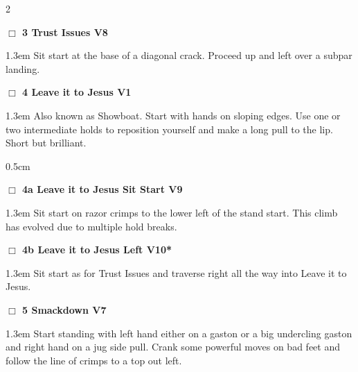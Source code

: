 	\begin{multicols}{2}
\needspace{2em}
\label{rt:Trust Issues}
\colorbox{Goldenrod!20}{
\parbox{0.95\linewidth}{
\hspace{-1ex}\textbf{$\Box$
3 Trust Issues V8  \warn\warn
}}}
\begin{adjustwidth}{1.3em}{}			
Sit start at the base of a diagonal crack. Proceed up and left over a subpar landing.
\end{adjustwidth}
\needspace{2em}
\label{rt:Leave it to Jesus}
\colorbox{green!20}{
\parbox{0.95\linewidth}{
\hspace{-1ex}\textbf{$\Box$
4 Leave it to Jesus V1  
}}}
\begin{adjustwidth}{1.3em}{}			
Also known as Showboat. Start with hands on sloping edges. Use one or two intermediate holds to reposition yourself and make a long pull to the lip. Short but brilliant.
\end{adjustwidth}
\begin{adjustwidth}{0.5cm}{}				
\needspace{4em}
\needspace{2em}
\label{vr:Leave it to Jesus Sit Start}
\colorbox{Goldenrod!20}{
\parbox{0.95\linewidth}{
\hspace{-1ex}\textbf{$\Box$
4a Leave it to Jesus Sit Start V9  
}}}
\begin{adjustwidth}{1.3em}{}			
Sit start on razor crimps to the lower left of the stand start. This climb has evolved due to multiple hold breaks.
\end{adjustwidth}
\needspace{2em}
\label{vr:Leave it to Jesus Left}
\colorbox{red!20}{
\parbox{0.95\linewidth}{
\hspace{-1ex}\textbf{$\Box$
4b Leave it to Jesus Left V10*  
}}}
\begin{adjustwidth}{1.3em}{}			
Sit start as for Trust Issues and traverse right all the way into Leave it to Jesus.
\end{adjustwidth}
\end{adjustwidth}
\needspace{2em}
\label{rt:Smackdown}
\colorbox{Goldenrod!20}{
\parbox{0.95\linewidth}{
\hspace{-1ex}\textbf{$\Box$
5 Smackdown V7  
}}}
\begin{adjustwidth}{1.3em}{}			
Start standing with left hand either on a gaston or a big undercling gaston and right hand on a jug side pull. Crank some powerful moves on bad feet and follow the line of crimps to a top out left.
\end{adjustwidth}

\end{multicols}
